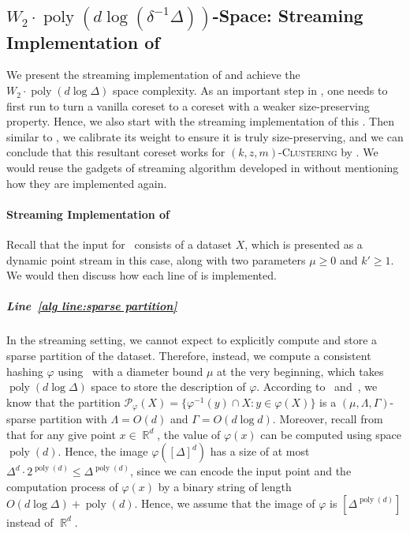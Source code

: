 \documentclass[letterpaper,11pt]{article}
\theoremstyle{plain}
\theoremstyle{definition}
\theoremstyle{remark}
\DeclareMathOperator{\R}{\mathbb{R}}
\DeclareMathOperator{\poly}{poly}
\renewcommand{\phi}{\varphi}
\newcommand{\calP}{\mathcal{P}}
\newcommand{\ProblemName}[1]{\textsc{#1}}
\newcommand{\kzmC}{\ProblemName{$(k,z,m)$-Clustering}\xspace}
\begin{document}
\subsection{$W_2\cdot\poly(d\log(\delta^{-1}\Delta))$-Space: Streaming Implementation of~}
\label{sec:streaming alg}
We present the streaming implementation of  and achieve the $W_2\cdot \poly(d\log\Delta)$ space complexity.
As an important step in , one needs to first run  to turn a vanilla coreset to a coreset with a weaker size-preserving property.
Hence, we also start with the streaming implementation of this .
Then similar to , we calibrate its weight to ensure it is truly size-preserving,
and we can conclude that this resultant coreset works for \kzmC by .
We would reuse the gadgets of streaming algorithm developed in  without mentioning how they are implemented again.




\paragraph{Streaming Implementation of~}
Recall that the input for~ consists of a dataset $X$, which is presented as a dynamic point stream in this case, along with two parameters $\mu\geq 0$ and $k'\geq 1$. 
We would then discuss how each line of  is implemented.

\subparagraph{Line~\ref{alg line:sparse partition}} 

In the streaming setting, we cannot expect to explicitly compute and store a sparse partition of the dataset. Therefore, instead, we compute a consistent hashing $\phi$ using~ with a diameter bound $\mu$ at the very beginning, which takes $\poly(d\log\Delta)$ space to store the description of $\phi$.
According to~ and~, we know that the partition $\calP_\phi(X) = \{\phi^{-1}(y)\cap X: y\in \phi(X)\}$ is a $(\mu,\Lambda,\Gamma)$-sparse partition with $\Lambda = O(d)$ and $\Gamma = O(d\log d)$. 
Moreover, recall from~ that for any give point $x\in \R^d$, the value of $\phi(x)$ can be computed using space $\poly(d)$. 
Hence, the image $\phi([\Delta]^d)$ has a size of at most $\Delta^d \cdot 2^{\poly(d)}\le \Delta^{\poly(d)}$, since we can encode the input point and the computation process of $\phi(x)$ by a binary string of length $O(d\log\Delta) + \poly(d)$. 
Hence, we assume that the image of $\phi$ is $[\Delta^{\poly(d)}]$ instead of $\R^d$.
\end{document}
